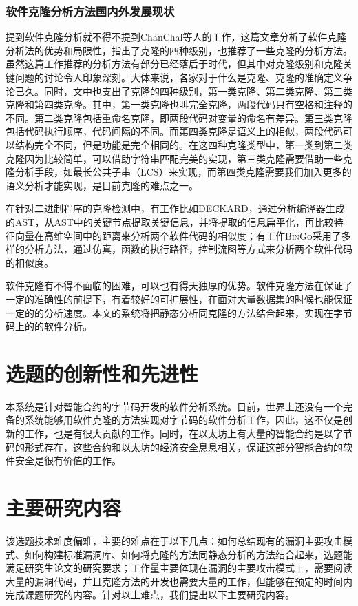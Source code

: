 \subsubsection{软件克隆分析方法国内外发展现状}\label{sec:clone_intro}
提到软件克隆分析就不得不提到ChanChal等人的工作\cite{survey-on-clone}，这篇文章分析了软件克隆分析法的优势和局限性，指出了克隆的四种级别，也推荐了一些克隆的分析方法。虽然这篇工作推荐的分析方法有部分已经落后于时代，但其中对克隆级别和克隆关键问题的讨论令人印象深刻。大体来说，各家对于什么是克隆、克隆的准确定义争论已久。同时，文中也支出了克隆的四种级别，第一类克隆、第二类克隆、第三类克隆和第四类克隆。其中，第一类克隆也叫完全克隆，两段代码只有空格和注释的不同。第二类克隆包括重命名克隆，即两段代码对变量的命名有差异。第三类克隆包括代码执行顺序，代码间隔的不同。而第四类克隆是语义上的相似，两段代码可以结构完全不同，但是功能是完全相同的。在这四种克隆类型中，第一类到第二类克隆因为比较简单，可以借助字符串匹配完美的实现，第三类克隆需要借助一些克隆分析手段，如最长公共子串（LCS）来实现，而第四类克隆需要我们加入更多的语义分析才能实现，是目前克隆的难点之一。

在针对二进制程序的克隆检测中，有工作比如\textsc{DECKARD}\cite{deckard}，通过分析编译器生成的AST，从AST中的关键节点提取关键信息，并将提取的信息扁平化，再比较特征向量在高维空间中的距离来分析两个软件代码的相似度；有工作\textsc{BinGo}\cite{bingo}采用了多样的分析方法，通过仿真，函数的执行路径，控制流图等方式来分析两个软件代码的相似度。

软件克隆有不得不面临的困难，可以也有得天独厚的优势。软件克隆方法在保证了一定的准确性的前提下，有着较好的可扩展性，在面对大量数据集的时候也能保证一定的的分析速度。本文的系统将把静态分析同克隆的方法结合起来，实现在字节码上的的软件分析。

\section{选题的创新性和先进性}

本系统是针对智能合约的字节码开发的软件分析系统。目前，世界上还没有一个完备的系统能够用软件克隆的方法实现对字节码的软件分析工作，因此，这不仅是创新的工作，也是有很大贡献的工作。同时，在以太坊上有大量的智能合约是以字节码的形式存在，这些合约和以太坊的经济安全息息相关，保证这部分智能合约的软件安全是很有价值的工作。

\section{主要研究内容}

该选题技术难度偏难，主要的难点在于以下几点：如何总结现有的漏洞主要攻击模式、如何构建标准漏洞库、如何将克隆的方法同静态分析的方法结合起来，选题能满足研究生论文的研究要求；工作量主要体现在漏洞的主要攻击模式上，需要阅读大量的漏洞代码，并且克隆方法的开发也需要大量的工作，但能够在预定的时间内完成课题研究的内容。针对以上难点，我们提出以下主要研究内容。

